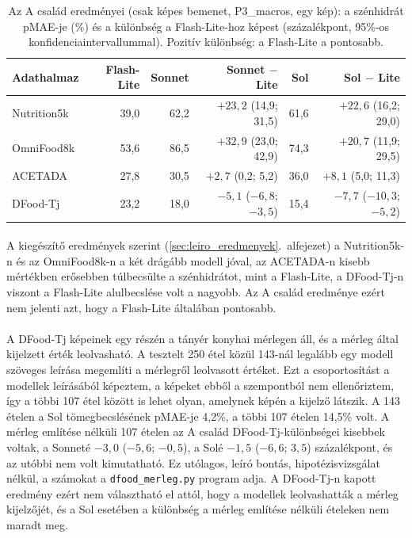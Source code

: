 \begin{table}[h]
\centering
\caption{Az A család eredményei (csak képes bemenet, P3\_macros, egy kép): a szénhidrát pMAE-je (\%) és a különbség 
a Flash-Lite-hoz képest (százalékpont, 95\%-os konfidenciaintervallummal). Pozitív különbség: a Flash-Lite a pontosabb.}
\label{tab:a_csalad}
\begin{tabular}{lrrrrr}
\hline
Adathalmaz & Flash-Lite & Sonnet & Sonnet $-$ Lite & Sol & Sol $-$ Lite \\
\hline
Nutrition5k & 39,0 & 62,2 & $+23{,}2$ (14,9; 31,5) & 61,6 & $+22{,}6$ (16,2; 29,0) \\
OmniFood8k  & 53,6 & 86,5 & $+32{,}9$ (23,0; 42,9) & 74,3 & $+20{,}7$ (11,9; 29,5) \\
ACETADA     & 27,8 & 30,5 & $+2{,}7$ (0,2; 5,2)    & 36,0 & $+8{,}1$ (5,0; 11,3) \\
DFood-Tj    & 23,2 & 18,0 & $-5{,}1$ ($-6{,}8$; $-3{,}5$) & 15,4 & $-7{,}7$ ($-10{,}3$; $-5{,}2$) \\
\hline
\end{tabular}
\end{table}

\paragraph{}A kiegészítő eredmények szerint (\ref{sec:leiro_eredmenyek}.~alfejezet) 
a Nutrition5k-n és az OmniFood8k-n a két drágább modell jóval, az ACETADA-n kisebb mértékben 
erősebben túlbecsülte a szénhidrátot, mint a Flash-Lite, a DFood-Tj-n viszont a Flash-Lite alulbecslése 
volt a nagyobb. Az A család eredménye ezért nem jelenti azt, hogy a Flash-Lite általában pontosabb.

\paragraph{}A DFood-Tj képeinek egy részén a tányér konyhai mérlegen áll, és a mérleg által 
kijelzett érték leolvasható. A tesztelt 250 étel közül 143-nál legalább egy modell szöveges 
leírása megemlíti a mérlegről leolvasott értéket. Ezt a csoportosítást a modellek leírásából 
képeztem, a képeket ebből a szempontból nem ellenőriztem, így a többi 107 étel között is lehet 
olyan, amelynek képén a kijelző látszik. A 143 ételen a Sol tömegbecslésének pMAE-je 4,2\%, a 
többi 107 ételen 14,5\% volt. A mérleg említése nélküli 107 ételen az A család DFood-Tj-különbségei 
kisebbek voltak, a Sonneté $-3{,}0$ ($-5{,}6$; $-0{,}5$), a Solé $-1{,}5$ ($-6{,}6$; $3{,}5$) 
százalékpont, és az utóbbi nem volt kimutatható. Ez utólagos, leíró bontás, hipotézisvizsgálat 
nélkül, a számokat a \texttt{dfood\_merleg.py} program adja. A DFood-Tj-n kapott eredmény ezért 
nem választható el attól, hogy a modellek leolvashatták a mérleg kijelzőjét, és a Sol esetében 
a különbség a mérleg említése nélküli ételeken nem maradt meg.

